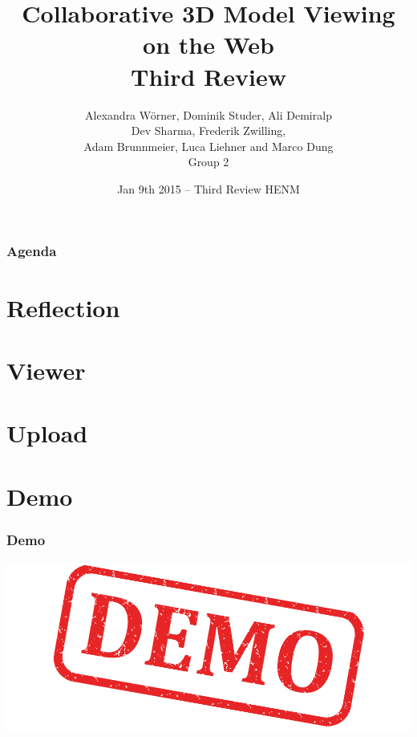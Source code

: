 

\title[Collaborative 3D Model Viewing on the Web]{Collaborative 3D Model Viewing on the Web\\ Third Review}
\author[Group 2]{%
  Alexandra Wörner, Dominik Studer, Ali Demiralp\\ Dev Sharma, Frederik Zwilling, \\
  Adam Brunnmeier, Luca Liehner and Marco Dung\\
  \bigskip
  {\scriptsize Group 2}
}

\date[Jan 9th 2015 @ HENM 2015]{Jan 9th 2015 -- Third Review HENM}



\frame[plain]{\titlepage}
\addtocounter{framenumber}{-1}

\begin{frame}
  \frametitle{Agenda}
  \tableofcontents[hideallsubsections]
\end{frame}

\section{Reflection}

\section{Viewer}

\section{Upload}

\section{Demo}

\begin{frame}
  \frametitle{Demo}
  \includegraphics[width=\textwidth]{images/demo}
\end{frame}

